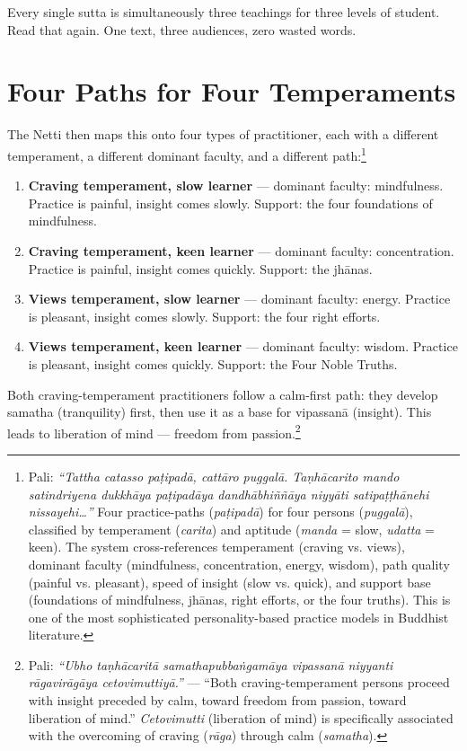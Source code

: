 Every single sutta is simultaneously three teachings for three levels of student. Read that again. One text, three audiences, zero wasted words.

\section*{Four Paths for Four Temperaments}

The Netti then maps this onto four types of practitioner, each with a different temperament, a different dominant faculty, and a different path:\footnote{Pali: \textit{``Tattha catasso paṭipadā, cattāro puggalā. Taṇhācarito mando satindriyena dukkhāya paṭipadāya dandhābhiññāya niyyāti satipaṭṭhānehi nissayehi\ldots''} Four practice-paths (\textit{paṭipadā}) for four persons (\textit{puggalā}), classified by temperament (\textit{carita}) and aptitude (\textit{manda} = slow, \textit{udatta} = keen). The system cross-references temperament (craving vs. views), dominant faculty (mindfulness, concentration, energy, wisdom), path quality (painful vs. pleasant), speed of insight (slow vs. quick), and support base (foundations of mindfulness, jhānas, right efforts, or the four truths). This is one of the most sophisticated personality-based practice models in Buddhist literature.}

\begin{enumerate}[itemsep=6pt]
\item \textbf{Craving temperament, slow learner} --- dominant faculty: mindfulness. Practice is painful, insight comes slowly. Support: the four foundations of mindfulness.

\item \textbf{Craving temperament, keen learner} --- dominant faculty: concentration. Practice is painful, insight comes quickly. Support: the jhānas.

\item \textbf{Views temperament, slow learner} --- dominant faculty: energy. Practice is pleasant, insight comes slowly. Support: the four right efforts.

\item \textbf{Views temperament, keen learner} --- dominant faculty: wisdom. Practice is pleasant, insight comes quickly. Support: the Four Noble Truths.
\end{enumerate}

Both craving-temperament practitioners follow a calm-first path: they develop samatha (tranquility) first, then use it as a base for vipassanā (insight). This leads to liberation of mind --- freedom from passion.\footnote{Pali: \textit{``Ubho taṇhācaritā samathapubbaṅgamāya vipassanā niyyanti rāgavirāgāya cetovimuttiyā.''} --- ``Both craving-temperament persons proceed with insight preceded by calm, toward freedom from passion, toward liberation of mind.'' \textit{Cetovimutti} (liberation of mind) is specifically associated with the overcoming of craving (\textit{rāga}) through calm (\textit{samatha}).}

